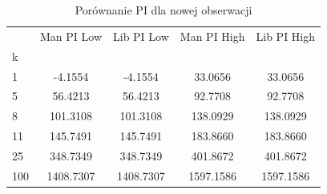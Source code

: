 \begin{table}[H]
\caption{Porównanie PI dla nowej obserwacji}
\label{tab:pi}
\begin{tabular}{lcccc}
\toprule
 & Man PI Low & Lib PI Low & Man PI High & Lib PI High \\
k &  &  &  &  \\
\midrule
1 & -4.1554 & -4.1554 & 33.0656 & 33.0656 \\
5 & 56.4213 & 56.4213 & 92.7708 & 92.7708 \\
8 & 101.3108 & 101.3108 & 138.0929 & 138.0929 \\
11 & 145.7491 & 145.7491 & 183.8660 & 183.8660 \\
25 & 348.7349 & 348.7349 & 401.8672 & 401.8672 \\
100 & 1408.7307 & 1408.7307 & 1597.1586 & 1597.1586 \\
\bottomrule
\end{tabular}
\end{table}
